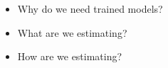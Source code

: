 \begin{itemize}
\item Why do we need trained models?
\item What are we estimating?
\item How are we estimating?
\end{itemize}